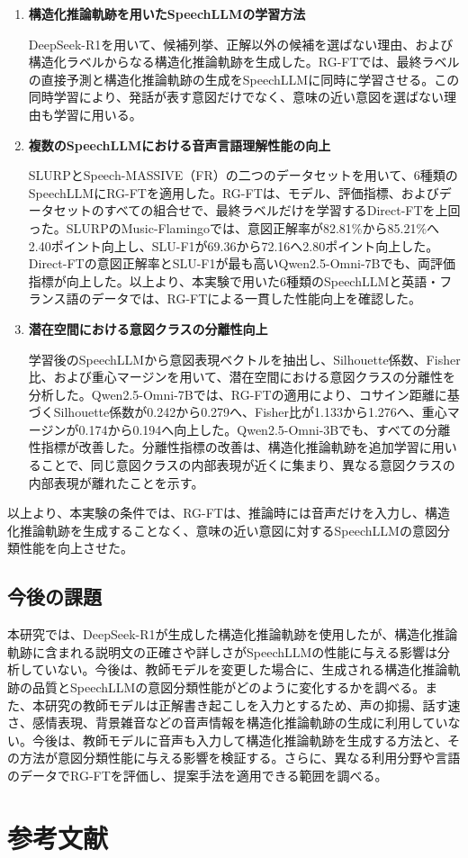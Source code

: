 \documentclass[11pt,a4paper]{ltjsarticle}
\begin{document}
\begin{enumerate}
\item \textbf{構造化推論軌跡を用いたSpeechLLMの学習方法}

DeepSeek-R1を用いて、候補列挙、正解以外の候補を選ばない理由、および構造化ラベルからなる構造化推論軌跡を生成した。RG-FTでは、最終ラベルの直接予測と構造化推論軌跡の生成をSpeechLLMに同時に学習させる。この同時学習により、発話が表す意図だけでなく、意味の近い意図を選ばない理由も学習に用いる。

\item \textbf{複数のSpeechLLMにおける音声言語理解性能の向上}

SLURPとSpeech-MASSIVE（FR）の二つのデータセットを用いて、6種類のSpeechLLMにRG-FTを適用した。RG-FTは、モデル、評価指標、およびデータセットのすべての組合せで、最終ラベルだけを学習するDirect-FTを上回った。SLURPのMusic-Flamingoでは、意図正解率が82.81\%から85.21\%へ2.40ポイント向上し、SLU-F1が69.36から72.16へ2.80ポイント向上した。Direct-FTの意図正解率とSLU-F1が最も高いQwen2.5-Omni-7Bでも、両評価指標が向上した。以上より、本実験で用いた6種類のSpeechLLMと英語・フランス語のデータでは、RG-FTによる一貫した性能向上を確認した。

\item \textbf{潜在空間における意図クラスの分離性向上}

学習後のSpeechLLMから意図表現ベクトルを抽出し、Silhouette係数、Fisher比、および重心マージンを用いて、潜在空間における意図クラスの分離性を分析した。Qwen2.5-Omni-7Bでは、RG-FTの適用により、コサイン距離に基づくSilhouette係数が0.242から0.279へ、Fisher比が1.133から1.276へ、重心マージンが0.174から0.194へ向上した。Qwen2.5-Omni-3Bでも、すべての分離性指標が改善した。分離性指標の改善は、構造化推論軌跡を追加学習に用いることで、同じ意図クラスの内部表現が近くに集まり、異なる意図クラスの内部表現が離れたことを示す。
\end{enumerate}

以上より、本実験の条件では、RG-FTは、推論時には音声だけを入力し、構造化推論軌跡を生成することなく、意味の近い意図に対するSpeechLLMの意図分類性能を向上させた。

\subsection{今後の課題}
本研究では、DeepSeek-R1が生成した構造化推論軌跡を使用したが、構造化推論軌跡に含まれる説明文の正確さや詳しさがSpeechLLMの性能に与える影響は分析していない。今後は、教師モデルを変更した場合に、生成される構造化推論軌跡の品質とSpeechLLMの意図分類性能がどのように変化するかを調べる。また、本研究の教師モデルは正解書き起こしを入力とするため、声の抑揚、話す速さ、感情表現、背景雑音などの音声情報を構造化推論軌跡の生成に利用していない。今後は、教師モデルに音声も入力して構造化推論軌跡を生成する方法と、その方法が意図分類性能に与える影響を検証する。さらに、異なる利用分野や言語のデータでRG-FTを評価し、提案手法を適用できる範囲を調べる。

\clearpage
\section{参考文献}
\begingroup
\renewcommand{\section}[2]{}


\endgroup

\end{document}
